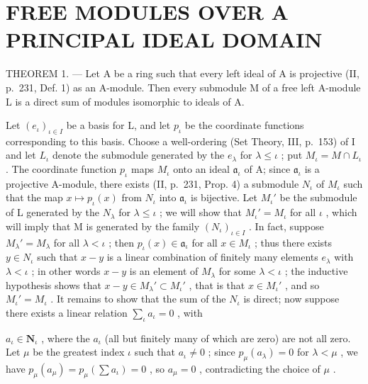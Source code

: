 \section{FREE MODULES OVER A PRINCIPAL IDEAL DOMAIN}

THEOREM 1. --- Let A be a ring such that every left ideal of A is projective (II, p.~231, Def. 1) as an A-module. Then every submodule M of a free left A-module L is a direct sum of modules isomorphic to ideals of A.

Let \((e_{\iota})_{\iota \in I}\) be a basis for L, and let \(p_{\iota}\) be the coordinate functions corresponding to this basis. Choose a well-ordering (Set Theory, III, p.~153) of I and let \(L_{\iota}\) denote the submodule generated by the \(e_{\lambda}\) for \(\lambda \leqslant \iota\) ; put \(M_{\iota} = M \cap L_{\iota}\) . The coordinate function \(p_{\iota}\) maps \(M_{\iota}\) onto an ideal \(\mathfrak{a}_{\iota}\) of A; since \(\mathfrak{a}_{\iota}\) is a projective A-module, there exists (II, p.~231, Prop. 4) a submodule \(N_{\iota}\) of \(M_{\iota}\) such that the map \(x \mapsto p_{\iota}(x)\) from \(N_{\iota}\) into \(\mathfrak{a}_{\iota}\) is bijective. Let \(M_{\iota}'\) be the submodule of L generated by the \(N_{\lambda}\) for \(\lambda \leqslant \iota\) ; we will show that \(M_{\iota}' = M_{\iota}\) for all \(\iota\) , which will imply that M is generated by the family \((N_{\iota})_{\iota \in I}\) . In fact, suppose \(M_{\lambda}' = M_{\lambda}\) for all \(\lambda < \iota\) ; then \(p_{\iota}(x) \in \mathfrak{a}_{\iota}\) for all \(x \in M_{\iota}\) ; thus there exists \(y \in N_{\iota}\) such that \(x - y\) is a linear combination of finitely many elements \(e_{\lambda}\) with \(\lambda < \iota\) ; in other words \(x - y\) is an element of \(M_{\lambda}\) for some \(\lambda < \iota\) ; the inductive hypothesis shows that \(x - y \in M_{\lambda}' \subset M_{\iota}'\) , that is that \(x \in M_{\iota}'\) , and so \(M_{\iota}' = M_{\iota}\) . It remains to show that the sum of the \(N_{\iota}\) is direct; now suppose there exists a linear relation \(\sum_{\iota} a_{\iota} = 0\) , with

\(a_{\iota} \in \mathbf{N}_{\iota}\) , where the \(a_{\iota}\) (all but finitely many of which are zero) are not all zero. Let \(\mu\) be the greatest index \(\iota\) such that \(a_{\iota} \neq 0\) ; since \(p_{\mu}(a_{\lambda}) = 0\) for \(\lambda < \mu\) , we have \(p_{\mu}(a_{\mu}) = p_{\mu}\left(\sum a_{\iota}\right) = 0\) , so \(a_{\mu} = 0\) , contradicting the choice of \(\mu\) .

